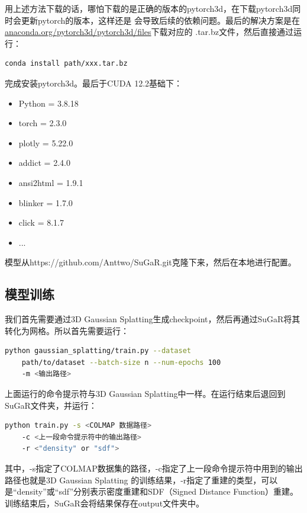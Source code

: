 \documentclass{nwputhesis}
\begin{document}
\indent
用上述方法下载的话，哪怕下载的是正确的版本的pytorch3d，在下载pytorch3d同时会更新pytorch的版本，这样还是
会导致后续的依赖问题。最后的解决方案是在\underline{anaconda.org/pytorch3d/pytorch3d/files}下载对应的
.tar.bz文件，然后直接通过运行：
\begin{lstlisting}[language=bash]
    conda install path/xxx.tar.bz
\end{lstlisting}
完成安装pytorch3d。最后于CUDA 12.2基础下：
\begin{itemize}
    \item Python = 3.8.18
    \item torch = 2.3.0
    \item plotly = 5.22.0
    \item addict = 2.4.0
    \item ansi2html = 1.9.1
    \item blinker = 1.7.0
    \item click = 8.1.7
    \item ...
\end{itemize}

\indent
模型从{https://github.com/Anttwo/SuGaR.git}克隆下来，然后在本地进行配置。
\subsection{模型训练}
\indent
我们首先需要通过3D Gaussian Splatting生成checkpoint，然后再通过SuGaR将其转化为网格。所以首先需要运行：
\begin{lstlisting}[language=bash]
    python gaussian_splatting/train.py --dataset 
    path/to/dataset --batch-size n --num-epochs 100 
    -m <输出路径>
\end{lstlisting}

\indent
上面运行的命令提示符与3D Gaussian Splatting中一样。在运行结束后退回到SuGaR文件夹，并运行：
\begin{lstlisting}[language=bash]
    python train.py -s <COLMAP 数据路径> 
    -c <上一段命令提示符中的输出路径> 
    -r <"density" or "sdf">
\end{lstlisting}

\indent
其中，-s指定了COLMAP数据集的路径，-c指定了上一段命令提示符中用到的输出路径也就是3D Gaussian Splatting
的训练结果，-r指定了重建的类型，可以是“density”或“sdf”分别表示密度重建和SDF（Signed Distance 
Function）重建。训练结束后，SuGaR会将结果保存在output文件夹中。\\
\end{document}

